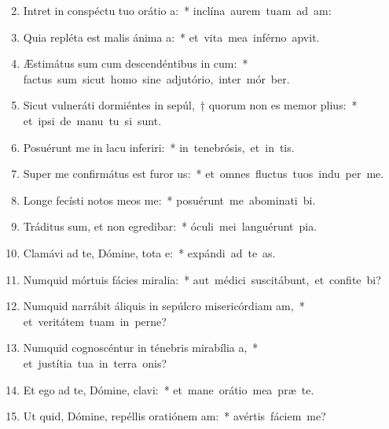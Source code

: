 \begin{flushleft}
\begin{enumerate}[leftmargin=*]
\setcounter{enumi}{1}

\item Intret in conspéctu tuo orátio a:~* \mbox{inclína aurem tuam ad  am:}
\item Quia repléta est malis ánima a:~* \mbox{et vita mea inférno apvit.}
\item Æstimátus sum cum descendéntibus in cum:~* \mbox{factus sum sicut homo sine adjutório, inter mór ber.}
\item Sicut vulneráti dormiéntes in sepúl,~† quorum non es memor plius:~* \mbox{et ipsi de manu tu si sunt.}
\item Posuérunt me in lacu inferiri:~* \mbox{in tenebrósis, et in  tis.}
\item Super me confirmátus est furor us:~* \mbox{et omnes fluctus tuos indu per me.}
\item Longe fecísti notos meos  me:~* \mbox{posuérunt me abominati bi.}
\item Tráditus sum, et non egredibar:~* \mbox{óculi mei languérunt  pia.}
\item Clamávi ad te, Dómine, tota e:~* \mbox{expándi ad te  as.}
\item Numquid mórtuis fácies miralia:~* \mbox{aut médici suscitábunt, et confite bi?}
\item Numquid narrábit áliquis in sepúlcro misericórdiam am,~* \mbox{et veritátem tuam in perne?}
\item Numquid cognoscéntur in ténebris mirabília a,~* \mbox{et justítia tua in terra onis?}
\item Et ego ad te, Dómine, clavi:~* \mbox{et mane orátio mea præ te.}
\item Ut quid, Dómine, repéllis oratiónem am:~* \mbox{avértis fáciem   me?}

\end{enumerate}
\end{flushleft}
